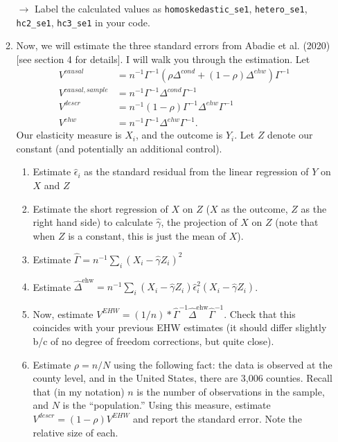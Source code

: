 \documentclass[11pt, a4paper]{article}
\begin{document}
\begin{enumerate}
\begin{enumerate}
\hspace{10pt} $\rightarrow$ Label the calculated values as \texttt{homoskedastic\_se1}, \texttt{hetero\_se1}, \texttt{hc2\_se1}, \texttt{hc3\_se1} in your code.
\item Now, we will estimate the three standard errors from Abadie et al. (2020) [see section 4 for details]. I will walk you through the estimation. Let 
\begin{align*}
    V^{causal} &= n^{-1}\Gamma^{-1}(\rho\Delta^{cond} + (1-\rho)\Delta^{ehw})\Gamma^{-1}\\
    V^{causal,sample} &= n^{-1}\Gamma^{-1}\Delta^{cond}\Gamma^{-1}\\
    V^{descr} &= n^{-1}(1-\rho)\Gamma^{-1}\Delta^{ehw}\Gamma^{-1}\\
    V^{ehw} &= n^{-1}\Gamma^{-1}\Delta^{ehw}\Gamma^{-1}.
\end{align*}
Our elasticity measure is $X_{i}$, and the outcome is $Y_{i}$. Let $Z$ denote our constant (and potentially an additional control).
  \begin{enumerate}
  \item Estimate $\hat{\epsilon}_{i}$ as the standard residual from
    the linear regression of $Y$ on $X$ and $Z$
  \item Estimate the short regression of $X$ on $Z$ ($X$ as the outcome, $Z$ as the right hand side)  to calculate $\hat{\gamma}$, the projection of $X$ on $Z$ (note that when $Z$ is a constant, this is just the mean of $X$).
  \item Estimate $\hat{\Gamma} = n^{-1}\sum_{i}(X_{i} - \hat{\gamma}Z_{i})^{2}$
  \item Estimate $\hat{\Delta}^{\textrm{ehw}} = n^{-1}\sum_{i}(X_{i} - \hat{\gamma}Z_{i})\hat{\epsilon}^{2}_{i}(X_{i} - \hat{\gamma}Z_{i})$.
  \item Now, estimate $V^{EHW} = (1/n) * \hat{\Gamma}^{-1}   \hat{\Delta}^{\textrm{ehw}} \hat{\Gamma}^{-1}$. Check that this coincides with your previous EHW estimates (it should differ slightly b/c of no degree of freedom corrections, but quite close).
  \item Estimate $\rho = n/N$ using the following fact: the data is observed at the county level, and in the United States, there are 3,006 counties. Recall that (in my notation) $n$ is the number of observations in the sample, and $N$ is the ``population.'' Using this measure, estimate $V^{descr} = (1-\rho)V^{EHW}$ and report the standard error. Note the relative size of each.


\end{enumerate}
\end{enumerate}
\end{enumerate}
\end{document}
